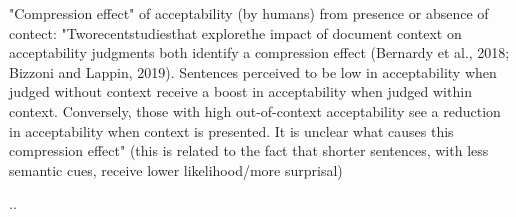 


"Compression effect" of acceptability (by humans) from presence or absence of contect:
"Tworecentstudiesthat explorethe impact of document context on acceptability judgments both
identify a compression effect (Bernardy et al.,
2018; Bizzoni and Lappin, 2019). Sentences perceived to be low in acceptability when judged
without context receive a boost in acceptability
when judged within context. Conversely, those
with high out-of-context acceptability see a reduction in acceptability when context is presented. It
is unclear what causes this compression effect" 
(this is related to the fact that shorter sentences, with less semantic cues, receive lower likelihood/more surprisal)

..


% 

